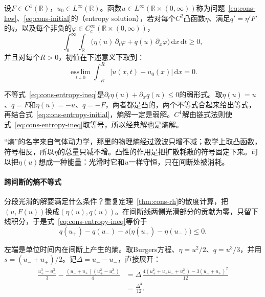\begin{definition}[熵解]
\label{def:cons-entropy-solution}
设$F\in C^1(\mathbb{R})$，$u_0\in L^{\infty}(\mathbb{R})$。函数$u\in L^{\infty}(\mathbb{R}\times(0,\infty))$称为问题~\eqref{eq:cons-law}、\eqref{eq:cons-initial}的（entropy solution），若对每个$C^2$凸函数$\eta$、满足$q'=\eta'F'$的$q$，以及每个非负的$\varphi\in C_c^{\infty}(\mathbb{R}\times(0,\infty))$，
\begin{equation}
  \int_0^{\infty}\!\!\int_{\mathbb{R}}\bigl(\eta(u)\,\partial_t\varphi+q(u)\,\partial_x\varphi\bigr)\,\mathrm{d}x\,\mathrm{d}t\geq0 ,
  \label{eq:cons-entropy-ineq}
\end{equation}
并且对每个$R>0$，初值在下述意义下取到：
\begin{equation}
  \operatorname*{ess\,lim}_{t\downarrow0}\int_{-R}^{R}\lvert u(x,t)-u_0(x)\rvert\,\mathrm{d}x=0 .
  \label{eq:cons-entropy-initial}
\end{equation}
\end{definition}

不等式~\eqref{eq:cons-entropy-ineq}是$\partial_t\eta(u)+\partial_xq(u)\leq0$的弱形式。取$\eta(u)=u$、$q=F$和$\eta(u)=-u$、$q=-F$，两者都是凸的，两个不等式合起来给出等式，再结合式~\eqref{eq:cons-entropy-initial}，熵解一定是弱解。$C^1$解由链式法则使式~\eqref{eq:cons-entropy-ineq}取等号，所以经典解也是熵解。

“熵”的名字来自气体动力学，那里的物理熵经过激波只增不减；数学上取凸函数，符号相反，所以$\eta$的总量只减不增。凸性的作用是把扩散耗散的符号固定下来。可以把$\eta(u)$想成一种能量：光滑时它和$u$一样守恒，只在间断处被消耗。

\paragraph{跨间断的熵不等式}
分段光滑的解要满足什么条件？重复定理~\ref{thm:cons-rh}的散度计算，把$(u,F(u))$换成$(\eta(u),q(u))$。在间断线两侧光滑部分的贡献为零，只留下线积分，于是式~\eqref{eq:cons-entropy-ineq}等价于
\begin{equation}
  q(u_+)-q(u_-)-s\bigl(\eta(u_+)-\eta(u_-)\bigr)\leq0 .
  \label{eq:cons-jump-entropy}
\end{equation}

左端是单位时间内在间断上产生的熵。取Burgers方程、$\eta=u^2/2$、$q=u^3/3$，并用$s=(u_-+u_+)/2$。记$\Delta=u_+-u_-$，直接展开：
\[
  \begin{aligned}
    \frac{u_+^3-u_-^3}{3}-\frac{(u_-+u_+)(u_+^2-u_-^2)}{4}
    &=\Delta\,\frac{4(u_+^2+u_+u_-+u_-^2)-3(u_-+u_+)^2}{12}\\
    &=\frac{\Delta^3}{12}.
  \end{aligned}
\]

